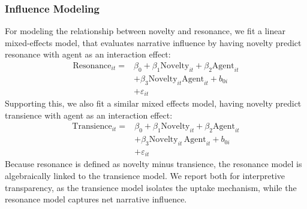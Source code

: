 \documentclass[11pt]{article}
\begin{document}
\subsubsection{Influence Modeling}
For modeling the relationship between novelty and resonance, we fit a linear mixed-effects model, that evaluates narrative influence by having novelty predict resonance with agent as an interaction effect:
\begin{equation}
\begin{aligned}
\mathrm{Resonance}_{it} ={}& \beta_0 + \beta_1 \mathrm{Novelty}_{it} + \beta_2 \mathrm{Agent}_{it} \\
&+ \beta_3 \mathrm{Novelty}_{it}\mathrm{Agent}_{it}
+ b_{0i} \\ &+ \varepsilon_{it}
\end{aligned}
\end{equation}
Supporting this, we also fit a similar mixed effects model, having novelty predict transience with agent as an interaction effect:
\begin{equation}
\begin{aligned}
\mathrm{Transience}_{it} ={}& \beta_0 + \beta_1 \mathrm{Novelty}_{it} + \beta_2 \mathrm{Agent}_{it} \\
&+ \beta_3 \mathrm{Novelty}_{it}\,\mathrm{Agent}_{it}
+ b_{0i} \\ &+ \varepsilon_{it}
\end{aligned}
\end{equation}
Because resonance is defined as novelty minus transience, the resonance model is algebraically linked to the transience model. We report both for interpretive transparency, as the transience model isolates the uptake mechanism, while the resonance model captures net narrative influence.
\end{document}
